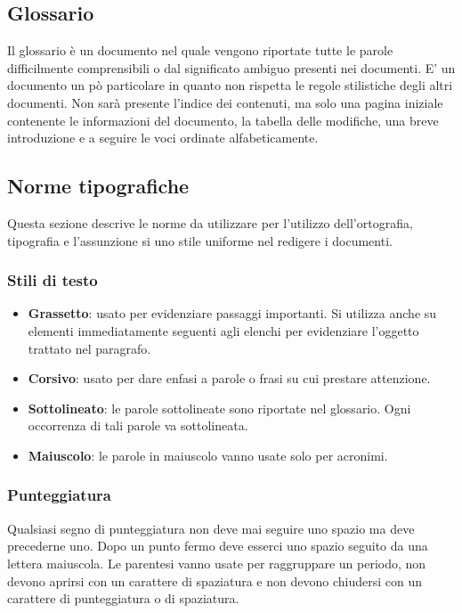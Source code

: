 \subsection{Glossario}
Il glossario è un documento nel quale vengono riportate tutte le parole difficilmente comprensibili o dal significato ambiguo presenti nei documenti. E' un documento un pò particolare in quanto non rispetta le regole stilistiche degli altri documenti. Non sarà presente l'indice dei contenuti, ma solo una pagina iniziale contenente le informazioni del documento, la tabella delle modifiche, una breve introduzione e a seguire le voci ordinate alfabeticamente.

\subsection{Norme tipografiche}
Questa sezione descrive le norme da utilizzare per l'utilizzo dell'ortografia, tipografia e l'assunzione si uno stile uniforme nel redigere i documenti.

\subsubsection{Stili di testo}
\begin{itemize}
\item \textbf{Grassetto}: usato per evidenziare passaggi importanti. Si utilizza anche su elementi immediatamente seguenti agli elenchi per evidenziare l'oggetto trattato nel paragrafo.
\item \textbf{Corsivo}: usato per dare enfasi a parole o frasi su cui prestare attenzione.
\item \textbf{Sottolineato}: le parole sottolineate sono riportate nel glossario. Ogni occorrenza di tali parole va sottolineata.
\item \textbf{Maiuscolo}: le parole in maiuscolo vanno usate solo per acronimi.
\end{itemize}

\subsubsection{Punteggiatura}
Qualsiasi segno di punteggiatura non deve mai seguire uno spazio ma deve precederne uno. Dopo un punto fermo deve esserci uno spazio seguito da una lettera maiuscola.
\newline
Le parentesi vanno usate per raggruppare un periodo, non devono aprirsi con un carattere di spaziatura e non devono chiudersi con un carattere di punteggiatura o di spaziatura.

